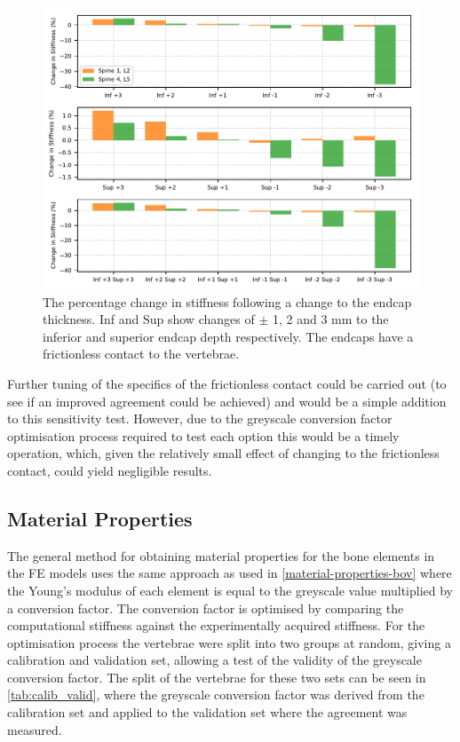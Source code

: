 \begin{figure}[h!]
\centering
\includegraphics[width=\textwidth]{Chapters/Chapter_HT_images/without.pdf}
\caption{The percentage change in stiffness following a change to the endcap
thickness. Inf and Sup show changes of $\pm$ 1, 2 and 3 mm to the inferior and
superior endcap depth respectively. The endcaps have a frictionless contact to
the vertebrae.}
\label{fig:without}
\end{figure}

Further tuning of the specifics of the frictionless contact could be carried
out (to see if an improved agreement could be achieved) and would be a simple
addition to this sensitivity test.
However, due to the greyscale conversion factor optimisation process required
to test each option this would be a timely operation, which, given the relatively small
effect of changing to the frictionless contact, could yield negligible
results.




\subsection{Material Properties}

The general method for obtaining material properties for the bone elements in the
FE models uses the same approach as used in \cref{material-properties-bov}
where the Young's modulus of each element is equal to the greyscale value
multiplied by a conversion factor.
The conversion factor is optimised by comparing the computational stiffness
against the experimentally acquired stiffness.
For the optimisation process the vertebrae were split into two groups at
random, giving a calibration and validation set, allowing a test of the
validity of the greyscale conversion factor.
The split of the vertebrae for these two sets can be seen in
\cref{tab:calib_valid}, where the greyscale conversion factor was derived from the calibration set and applied to the validation set where the agreement was measured.

